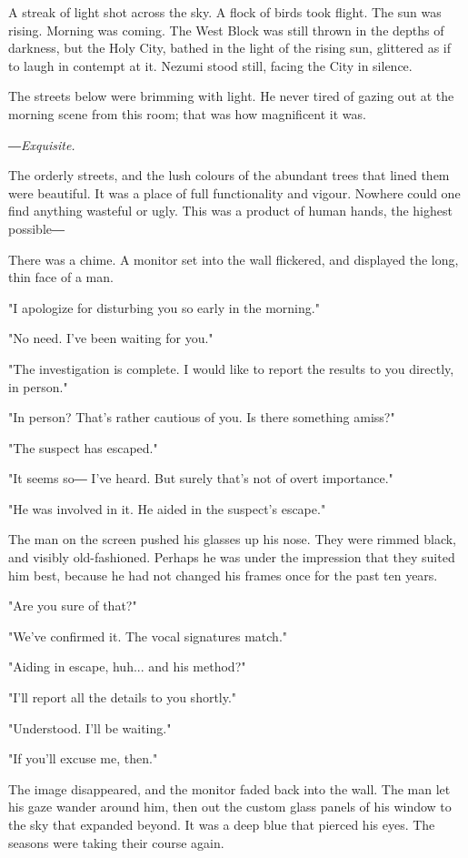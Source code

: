 A streak of light shot across the sky. A flock of birds took flight. The
sun was rising. Morning was coming. The West Block was still thrown in
the depths of darkness, but the Holy City, bathed in the light of the
rising sun, glittered as if to laugh in contempt at it. Nezumi stood
still, facing the City in silence.

\mybreak

The streets below were brimming with light. He never tired of gazing out
at the morning scene from this room; that was how magnificent it was.

\emph{―Exquisite.}

The orderly streets, and the lush colours of the abundant trees that
lined them were beautiful. It was a place of full functionality and
vigour. Nowhere could one find anything wasteful or ugly. This was a
product of human hands, the highest possible―

There was a chime. A monitor set into the wall flickered, and displayed
the long, thin face of a man.

"I apologize for disturbing you so early in the morning."

"No need. I've been waiting for you."

"The investigation is complete. I would like to report the results to
you directly, in person."

"In person? That's rather cautious of you. Is there something amiss?"

"The suspect has escaped."

"It seems so― I've heard. But surely that's not of overt importance."

"He was involved in it. He aided in the suspect's escape."

The man on the screen pushed his glasses up his nose. They were rimmed
black, and visibly old-fashioned. Perhaps he was under the impression
that they suited him best, because he had not changed his frames once
for the past ten years.

"Are you sure of that?"

"We've confirmed it. The vocal signatures match."

"Aiding in escape, huh... and his method?"

"I'll report all the details to you shortly."

"Understood. I'll be waiting."

"If you'll excuse me, then."

The image disappeared, and the monitor faded back into the wall. The man
let his gaze wander around him, then out the custom glass panels of his
window to the sky that expanded beyond. It was a deep blue that pierced
his eyes. The seasons were taking their course again.

